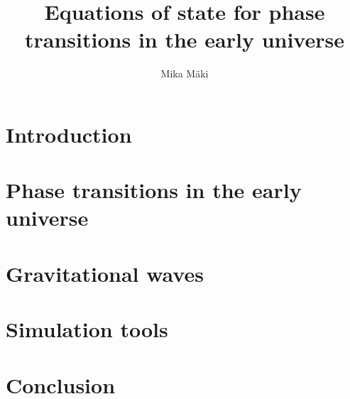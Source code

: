 \documentclass[a4paper]{report}
\title{Equations of state for phase transitions in the early universe}
\author{Mika Mäki}
\begin{document}
\maketitle

\tableofcontents
\listoffigures
\listoftables



\chapter{Introduction}
\label{ch:introduction}


\chapter{Phase transitions in the early universe}
\label{ch:pt}


\chapter{Gravitational waves}
\label{ch:gw}


\chapter{Simulation tools}
\label{ch:simulation}


\chapter{Conclusion}
\label{ch:conclusion}


\printbibliography[heading=bibintoc]


\end{document}
